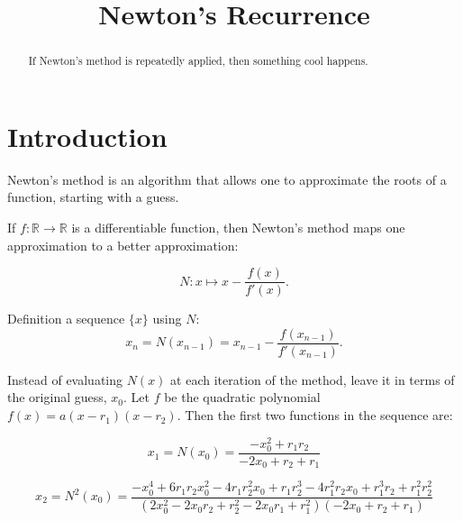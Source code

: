 \documentclass[notitlepage, 10pt]{article}
\title{Newton's Recurrence}
\newcommand{\R}{\mathbb{R}}
\newcommand{\onto}{\rightarrow}
\begin{document}
\maketitle

\begin{abstract}
If Newton's method is repeatedly applied, then something cool happens.
\end{abstract}

\section{Introduction}

Newton's method is an algorithm that allows one to approximate the
roots of a function, starting with a guess.

If $f:\R \onto \R$ is a differentiable function, then Newton's method
maps one approximation to a better approximation:

$$N : x \mapsto x - \frac{f(x)}{f'(x)}.$$

Definition a sequence $\{x\}$ using $N$:
$$x_n = N(x_{n-1})  = x_{n-1} - \frac{f(x_{n-1})}{f'(x_{n-1})}. $$

Instead of evaluating $N(x)$ at each iteration of the method, leave it
in terms of the original guess, $x_0$.  Let $f$ be the quadratic
polynomial $f(x)= a(x-r_1)(x-r_2)$.  Then the first two functions in
the sequence are:

$$x_1 = N(x_0) = \frac{ - x_0^2 + r_1 r_2}{ - 2 x_0 + r_2 + r_1}$$

$$x_2 = N^2(x_0) = \frac
{ - x_0^4 + 6 r_1 r_2 x_0^2 - 4 r_1 r_2^2 x_0 + r_1 r_2^3 - 4 r_1^2
  r_2 x_0 + r_1^3 r_2 + r_1^2 r_2^2 } 
{(2 x_0^2 - 2 x_0 r_2 + r_2^2 - 2 x_0 r_1 + r_1^2)( - 2 x_0 + r_2 +
  r_1)}$$ 

\end{document}
